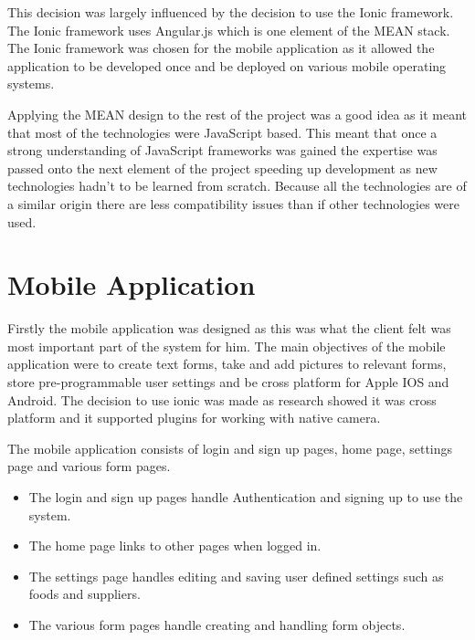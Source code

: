 This decision was largely influenced by the decision to use the Ionic framework. The Ionic framework uses Angular.js which is one element of the MEAN stack. The Ionic framework was chosen for the mobile application as it allowed the application to be developed once and be deployed on various mobile operating systems.

Applying the MEAN design to the rest of the project was a good idea as it meant that most of the technologies were JavaScript based. This meant that once a strong understanding of JavaScript frameworks was gained the expertise was passed onto the next element of the project speeding up development as new technologies hadn't to be learned from scratch. Because all the technologies are of a similar origin there are less compatibility issues than if other technologies were used.

\section{Mobile Application}
Firstly the mobile application was designed as this was what the client felt was most important part of the system for him. The main objectives of the mobile application were to create text forms, take and add pictures to relevant forms, store pre-programmable user settings and be cross platform for Apple IOS and Android. The decision to use ionic was made as research showed it was cross platform and it supported plugins for working with native camera.

The mobile application consists of login and sign up pages, home page, settings page and various form pages.
\begin{itemize}
\item The login and sign up pages handle Authentication and signing up to use the system.
\item The home page links to other pages when logged in.
\item The settings page handles editing and saving user defined settings such as foods and suppliers.
\item The various form pages handle creating and handling form objects.
\end{itemize}	

